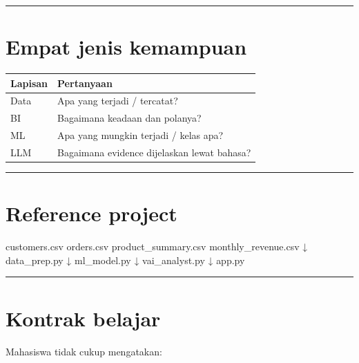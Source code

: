 \documentclass[
  indonesian,
  letterpaper,
  DIV=11,
  numbers=noendperiod]{scrreprt}
\newenvironment{Shaded}{\begin{snugshade}}{\end{snugshade}}
\newcommand{\NormalTok}[1]{\textcolor[rgb]{0.00,0.23,0.31}{#1}}
\newcounter{none} %
\begin{document}
\begin{center}\rule{0.5\linewidth}{0.5pt}\end{center}

\section{Empat jenis kemampuan}\label{empat-jenis-kemampuan}

{\def\LTcaptype{none} %
\begin{longtable}[]{@{}ll@{}}
\toprule\noalign{}
Lapisan & Pertanyaan \\
\midrule\noalign{}
\endhead
\bottomrule\noalign{}
\endlastfoot
Data & Apa yang terjadi / tercatat? \\
BI & Bagaimana keadaan dan polanya? \\
ML & Apa yang mungkin terjadi / kelas apa? \\
LLM & Bagaimana evidence dijelaskan lewat bahasa? \\
\end{longtable}
}

\begin{center}\rule{0.5\linewidth}{0.5pt}\end{center}

\section{Reference project}\label{reference-project}

\begin{Shaded}
\begin{Highlighting}[]
\NormalTok{customers.csv}
\NormalTok{orders.csv}
\NormalTok{product\_summary.csv}
\NormalTok{monthly\_revenue.csv}
\NormalTok{        ↓}
\NormalTok{data\_prep.py}
\NormalTok{        ↓}
\NormalTok{ml\_model.py}
\NormalTok{        ↓}
\NormalTok{vai\_analyst.py}
\NormalTok{        ↓}
\NormalTok{app.py}
\end{Highlighting}
\end{Shaded}

\begin{center}\rule{0.5\linewidth}{0.5pt}\end{center}

\section{Kontrak belajar}\label{kontrak-belajar}

Mahasiswa tidak cukup mengatakan:
\end{document}

